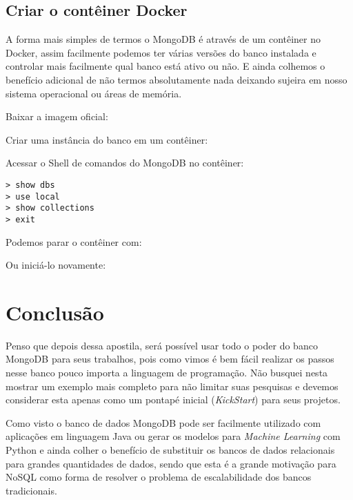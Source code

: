 \documentclass[a4paper,11pt]{article}
\begin{document}
\subsection{Criar o contêiner Docker}
A forma mais simples de termos o MongoDB é através de um contêiner no Docker, assim facilmente podemos ter várias versões do banco instalada e controlar mais facilmente qual banco está ativo ou não. E ainda colhemos o benefício adicional de não termos absolutamente nada deixando sujeira em nosso sistema operacional ou áreas de memória.

Baixar a imagem oficial: \\

Criar uma instância do banco em um contêiner: \\

Acessar o Shell de comandos do MongoDB no contêiner: \\
\begin{lstlisting}[]
> show dbs
> use local
> show collections
> exit
\end{lstlisting}

Podemos parar o contêiner com: \\

Ou iniciá-lo novamente: \\





\section{Conclusão}
Penso que depois dessa apostila, será possível usar todo o poder do banco MongoDB para seus trabalhos, pois como vimos é bem fácil realizar os passos nesse banco pouco importa a linguagem de programação. Não busquei nesta mostrar um exemplo mais completo para não limitar suas pesquisas e devemos considerar esta apenas como um pontapé inicial (\textit{KickStart}) para seus projetos.

Como visto o banco de dados MongoDB pode ser facilmente utilizado com aplicações em linguagem Java ou gerar os modelos para \textit{Machine Learning} com Python e ainda colher o benefício de substituir os bancos de dados relacionais para grandes quantidades de dados, sendo que esta é a grande motivação para NoSQL como forma de resolver o problema de escalabilidade dos bancos tradicionais.
\end{document}
